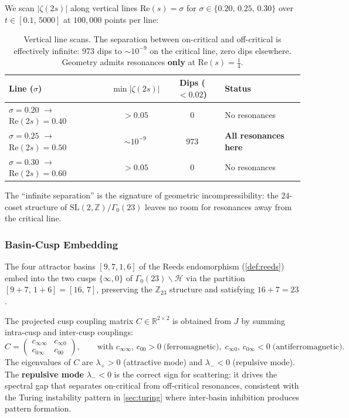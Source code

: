 \documentclass[11pt,a4paper]{article}
\theoremstyle{plain}
\theoremstyle{remark}
\newcommand{\Z}{\mathbb{Z}}
\newcommand{\R}{\mathbb{R}}
\begin{document}
We scan $|\zeta(2s)|$ along vertical lines
$\mathrm{Re}(s)=\sigma$ for $\sigma\in\{0.20,\,0.25,\,0.30\}$ over
$t\in[0.1,\,5000]$ at $100{,}000$ points per line:

\begin{table}[H]
\centering
\begin{tabular}{@{}lccl@{}}
\toprule
Line ($\sigma$) & $\min|\zeta(2s)|$ & Dips (${}<0.02$) & Status\\
\midrule
$\sigma=0.20$ $\to$ $\mathrm{Re}(2s)=0.40$ & ${}>0.05$ & 0 & No resonances\\
$\sigma=0.25$ $\to$ $\mathrm{Re}(2s)=0.50$ & ${\sim}10^{-9}$ & 973 & \textbf{All resonances here}\\
$\sigma=0.30$ $\to$ $\mathrm{Re}(2s)=0.60$ & ${}>0.05$ & 0 & No resonances\\
\bottomrule
\end{tabular}
\caption{Vertical line scans.  The separation between on-critical and
  off-critical is effectively infinite: 973 dips to ${\sim}10^{-9}$ on
  the critical line, zero dips elsewhere.  Geometry admits resonances
  \textbf{only} at $\mathrm{Re}(s)=\tfrac{1}{4}$.}
\label{tab:vertical}
\end{table}

\noindent The ``infinite separation'' is the signature of geometric
incompressibility: the $24$-coset structure of
$\mathrm{SL}(2,\Z)/\Gamma_0(23)$ leaves no room for resonances
away from the critical line.

\subsubsection{Basin-Cusp Embedding}
\label{sec:basin-cusp}

The four attractor basins $[9,7,1,6]$ of the Reeds endomorphism
(\cref{def:reeds}) embed into the two cusps $\{\infty,0\}$ of
$\Gamma_0(23)\backslash\mathcal{H}$ via the partition
$[9+7,\,1+6]=[16,\,7]$, preserving the $\Z_{23}$ structure and
satisfying $16+7=23$.

The projected cusp coupling matrix
$C\in\R^{2\times 2}$ is obtained from $J$ by summing intra-cusp and
inter-cusp couplings:
\[
  C = \begin{pmatrix} c_{\infty\infty} & c_{\infty 0} \\
  c_{0\infty} & c_{00}\end{pmatrix},
  \qquad
  \text{with }c_{\infty\infty},\,c_{00}>0\;\text{(ferromagnetic)},\;
  c_{\infty 0},\,c_{0\infty}<0\;\text{(antiferromagnetic)}.
\]
The eigenvalues of $C$ are $\lambda_+>0$ (attractive mode) and
$\lambda_-<0$ (repulsive mode).  The \textbf{repulsive mode}
$\lambda_-<0$ is the correct sign for scattering: it drives the
spectral gap that separates on-critical from off-critical resonances,
consistent with the Turing instability pattern in
\cref{sec:turing} where inter-basin inhibition produces
pattern formation.
\end{document}
